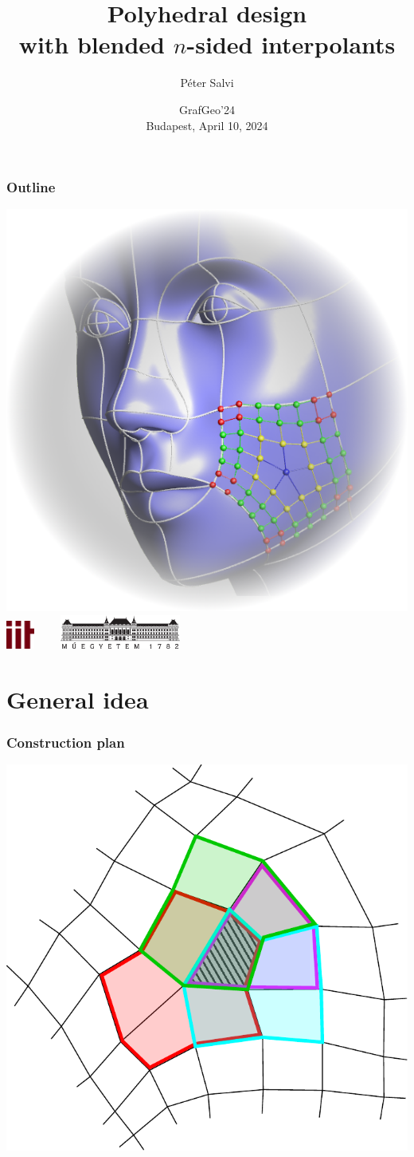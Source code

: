 \documentclass{beamer}
\title{Polyhedral design\\with blended $n$-sided interpolants}
\author{P\'eter Salvi}
\institute{Budapest University of Technology and Economics}
\date{GrafGeo'24\\\vspace{1em}Budapest, April 10, 2024}
\begin{document}
\begin{frame}
  \titlepage
\end{frame}

\begin{frame}
  \frametitle{Outline}
  \hfill\includegraphics[width=.35\textwidth]{images/face-gradient.png}\\
  \vspace{-10em}
  \tableofcontents
  \centering
  \includegraphics[height=2.5em]{images/iit.png}$\qquad$
  \includegraphics[height=3em]{images/bme.jpg}
\end{frame}

\section{General idea}

\begin{frame}
  \frametitle{Construction plan}
  \centering
  \includegraphics[width=.7\textwidth]{images/idea.pdf}
\end{frame}
\end{document}
